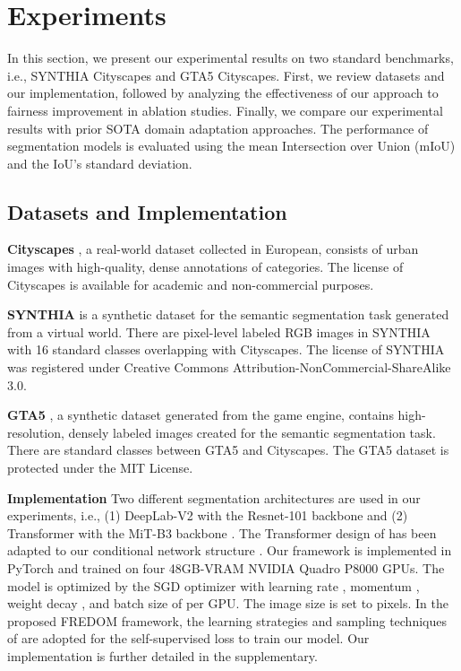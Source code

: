 \documentclass[10pt,twocolumn,letterpaper]{article}
\begin{document}
\vspace{-2mm}
\section{Experiments}
In this section, we present our experimental results on two standard benchmarks, i.e., SYNTHIA  Cityscapes and GTA5  Cityscapes. First, we review datasets and our implementation, followed by analyzing the effectiveness of our approach to fairness improvement in ablation studies. Finally, we compare our experimental results with prior SOTA domain adaptation approaches. The performance of segmentation models is evaluated using the mean Intersection over Union (mIoU) and the IoU's standard deviation. 

\subsection{Datasets and Implementation}
\noindent
\textbf{Cityscapes} \cite{cordts2016cityscapes}, a real-world dataset collected in European, 
consists of   urban images with high-quality, dense annotations of  categories. 
The license of Cityscapes is available for academic and non-commercial purposes.

\noindent
\textbf{SYNTHIA} \cite{Ros_2016_CVPR} is a synthetic dataset for the semantic segmentation task generated from a virtual world. There are  pixel-level labeled RGB images in SYNTHIA with 16 standard classes overlapping with Cityscapes. 
The license of SYNTHIA was registered under Creative Commons Attribution-NonCommercial-ShareAlike 3.0. 

\noindent
\textbf{GTA5} \cite{Richter_2016_ECCV}, a synthetic dataset generated from the game engine, contains  high-resolution, densely labeled images created for the semantic segmentation task. There are  standard classes between GTA5 and Cityscapes. The GTA5 dataset is protected under the MIT License.

\noindent \textbf{Implementation} Two different segmentation architectures are used in our experiments, i.e., (1) DeepLab-V2 \cite{chen2018deeplab} with the Resnet-101 backbone and (2) Transformer with the MiT-B3 backbone \cite{xie2021segformer}. The Transformer design of \cite{chen2020generative} has been adapted to our conditional network structure . Our framework is implemented in PyTorch and trained on four 48GB-VRAM NVIDIA Quadro P8000 GPUs. The model is optimized by the SGD optimizer \cite{Bottou10large-scalemachine} with learning rate , momentum , weight decay , and batch size of  per GPU. The image size is set to  pixels. In the proposed FREDOM framework, the learning strategies and sampling techniques of \cite{daformer, Araslanov:2021:DASAC} are adopted for the self-supervised loss  to train our model. Our implementation is further detailed in the supplementary.
\end{document}
